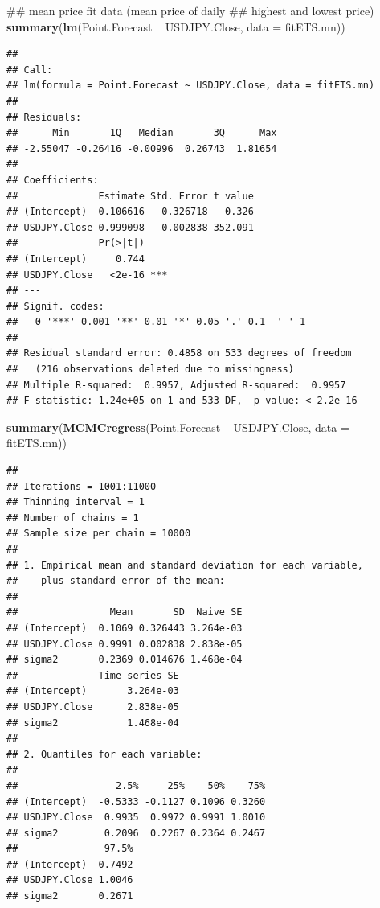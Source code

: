 \documentclass[]{tufte-book}
\newenvironment{Shaded}{}{}
\newcommand{\KeywordTok}[1]{\textcolor[rgb]{0.00,0.44,0.13}{\textbf{#1}}}
\newcommand{\DataTypeTok}[1]{\textcolor[rgb]{0.56,0.13,0.00}{#1}}
\newcommand{\StringTok}[1]{\textcolor[rgb]{0.25,0.44,0.63}{#1}}
\newcommand{\OperatorTok}[1]{\textcolor[rgb]{0.40,0.40,0.40}{#1}}
\newcommand{\NormalTok}[1]{#1}
\begin{document}
\begin{Shaded}
\begin{Highlighting}[]
\NormalTok{## mean price fit data (mean price of daily}
\NormalTok{## highest and lowest price)}
\KeywordTok{summary}\NormalTok{(}\KeywordTok{lm}\NormalTok{(Point.Forecast }\OperatorTok{~}\StringTok{ }\NormalTok{USDJPY.Close, }\DataTypeTok{data =}\NormalTok{ fitETS.mn))}
\end{Highlighting}
\end{Shaded}

\begin{verbatim}
## 
## Call:
## lm(formula = Point.Forecast ~ USDJPY.Close, data = fitETS.mn)
## 
## Residuals:
##      Min       1Q   Median       3Q      Max 
## -2.55047 -0.26416 -0.00996  0.26743  1.81654 
## 
## Coefficients:
##              Estimate Std. Error t value
## (Intercept)  0.106616   0.326718   0.326
## USDJPY.Close 0.999098   0.002838 352.091
##              Pr(>|t|)    
## (Intercept)     0.744    
## USDJPY.Close   <2e-16 ***
## ---
## Signif. codes:  
##   0 '***' 0.001 '**' 0.01 '*' 0.05 '.' 0.1  ' ' 1
## 
## Residual standard error: 0.4858 on 533 degrees of freedom
##   (216 observations deleted due to missingness)
## Multiple R-squared:  0.9957, Adjusted R-squared:  0.9957 
## F-statistic: 1.24e+05 on 1 and 533 DF,  p-value: < 2.2e-16
\end{verbatim}

\begin{Shaded}
\begin{Highlighting}[]
\KeywordTok{summary}\NormalTok{(}\KeywordTok{MCMCregress}\NormalTok{(Point.Forecast }\OperatorTok{~}\StringTok{ }\NormalTok{USDJPY.Close, }
    \DataTypeTok{data =}\NormalTok{ fitETS.mn))}
\end{Highlighting}
\end{Shaded}

\begin{verbatim}
## 
## Iterations = 1001:11000
## Thinning interval = 1 
## Number of chains = 1 
## Sample size per chain = 10000 
## 
## 1. Empirical mean and standard deviation for each variable,
##    plus standard error of the mean:
## 
##                Mean       SD  Naive SE
## (Intercept)  0.1069 0.326443 3.264e-03
## USDJPY.Close 0.9991 0.002838 2.838e-05
## sigma2       0.2369 0.014676 1.468e-04
##              Time-series SE
## (Intercept)       3.264e-03
## USDJPY.Close      2.838e-05
## sigma2            1.468e-04
## 
## 2. Quantiles for each variable:
## 
##                 2.5%     25%    50%    75%
## (Intercept)  -0.5333 -0.1127 0.1096 0.3260
## USDJPY.Close  0.9935  0.9972 0.9991 1.0010
## sigma2        0.2096  0.2267 0.2364 0.2467
##               97.5%
## (Intercept)  0.7492
## USDJPY.Close 1.0046
## sigma2       0.2671
\end{verbatim}
\end{document}
